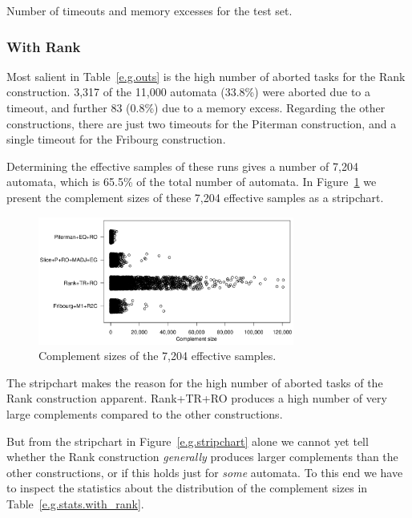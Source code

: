 \begin{table}[ht]
\centering

\caption{Number of timeouts and memory excesses for the \goal{} test set.}
\label{e.g.outs}
\end{table}

\subsubsection{With Rank}

Most salient in Table~\ref{e.g.outs} is the high number of aborted tasks for the Rank construction. 3,317 of the 11,000 automata (33.8\%) were aborted due to a timeout, and further 83 (0.8\%) due to a memory excess. Regarding the other constructions, there are just two timeouts for the Piterman construction, and a single timeout for the Fribourg construction.

Determining the effective samples of these runs gives a number of 7,204 automata, which is 65.5\% of the total number of automata. In Figure~\ref{e.g.stripchart.with_rank} we present the complement sizes of these 7,204 effective samples as a stripchart. 

\begin{figure}[ht]
\centering
\includegraphics[width=0.75\textwidth]{figures/r/external/goal/s.stripchart.with_rank.pdf}
\caption{Complement sizes of the 7,204 effective samples.}
\label{e.g.stripchart.with_rank}
\end{figure}

The stripchart makes the reason for the high number of aborted tasks of the Rank construction apparent. Rank+TR+RO produces a high number of very large complements compared to the other constructions.

But from the stripchart in Figure~\ref{e.g.stripchart} alone we cannot yet tell whether the Rank construction \textit{generally} produces larger complements than the other constructions, or if this holds just for \textit{some} automata. To this end we have to inspect the statistics about the distribution of the complement sizes in Table~\ref{e.g.stats.with_rank}.

